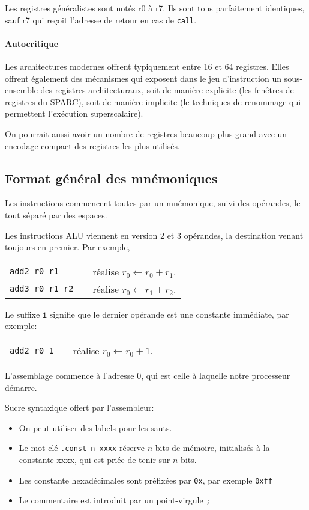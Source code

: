 \documentclass[architecture]{compas2018}
\begin{document}
Les registres généralistes sont notés r0 à r7.
Ils sont tous parfaitement identiques, sauf r7 qui reçoit l'adresse de retour en cas de \texttt{call}.

\paragraph*{Autocritique} Les architectures modernes offrent typiquement entre 16 et 64 registres.
Elles offrent également des mécanismes qui exposent dans le jeu d'instruction un sous-ensemble des registres architecturaux, soit de manière explicite (les fenêtres de registres du SPARC), soit de manière implicite (le techniques de renommage qui permettent l'exécution superscalaire).

On pourrait aussi avoir un nombre de registres beaucoup plus grand avec un encodage compact des registres les plus utilisés.

\subsection{Format général des mnémoniques}
Les instructions commencent toutes par un mnémonique, suivi des opérandes, le tout séparé par des espaces.

Les instructions ALU viennent en version 2 et 3 opérandes, la destination venant toujours en premier.
Par exemple, \\
 \begin{tabular}{lcl}
 \texttt{add2 r0 r1}&& réalise $r_0 \leftarrow r_0+r_1$. \\
 \texttt{add3 r0 r1 r2}&& réalise $r_0 \leftarrow r_1+r_2$.
 \end{tabular}
 
Le suffixe \texttt{i} signifie que le dernier opérande est une constante immédiate, par exemple:\\
 \begin{tabular}{lcl}
 \texttt{add2 r0 1}&& réalise $r_0 \leftarrow r_0+1$. \\
 \end{tabular}

L'assemblage commence à l'adresse 0, qui est celle à laquelle notre processeur démarre.

 
Sucre syntaxique offert par l'assembleur:
\begin{itemize}
\item On peut utiliser des labels pour les sauts.
\item Le mot-clé \texttt{.const n xxxx}  réserve $n$ bits de mémoire, initialisés à la constante xxxx, qui est priée de tenir sur $n$ bits.
\item Les constante hexadécimales sont préfixées par \texttt{0x}, par exemple \texttt{0xff}
\item Le commentaire est introduit par un point-virgule \texttt{;}
\end{itemize}
 
\end{document}
